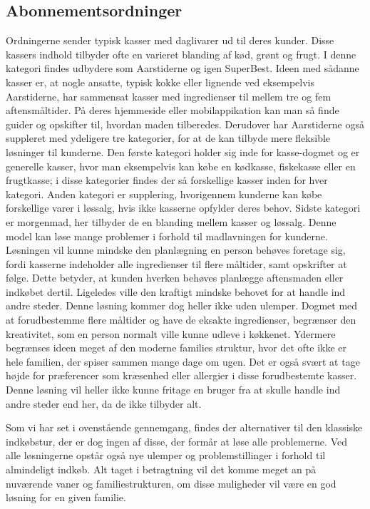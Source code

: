 \subsection{Abonnementsordninger}
Ordningerne sender typisk kasser med daglivarer ud til deres kunder.
Disse kassers indhold tilbyder ofte en varieret blanding af kød, grønt og frugt.
I denne kategori findes udbydere som Aarstiderne og igen SuperBest\citep{SOTA_MP_AAR, SOTA_MP_SB}.
Ideen med sådanne kasser er, at nogle ansatte, typisk kokke eller lignende ved eksempelvis Aarstiderne, har sammensat kasser med ingredienser til mellem tre og fem aftensmåltider.
På deres hjemmeside eller mobilappikation kan man så finde guider og opskifter til, hvordan maden tilberedes.
Derudover har Aarstiderne også suppleret med ydeligere tre kategorier, for at de kan tilbyde mere fleksible løsninger til kunderne.
Den første kategori holder sig inde for kasse-dogmet og er generelle kasser, hvor man eksempelvis kan købe en kødkasse, fiskekasse eller en frugtkasse; i disse kategorier findes der så forskellige kasser inden for hver kategori.
Anden kategori er supplering, hvorigennem kunderne kan købe forskellige varer i løssalg, hvis ikke kasserne opfylder deres behov.
Sidste kategori er morgenmad, her tilbyder de en blanding mellem kasser og løssalg.
Denne model kan løse mange problemer i forhold til madlavningen for kunderne.
Løsningen vil kunne mindske den planlægning en person behøves foretage sig, fordi kasserne indeholder alle ingredienser til flere måltider, samt opskrifter at følge.
Dette betyder, at kunden hverken behøves planlægge aftensmaden eller indkøbet dertil.
Ligeledes ville den kraftigt mindske behovet for at handle ind andre steder.
Denne løsning kommer dog heller ikke uden ulemper.
Dogmet med at forudbestemme flere måltider og have de eksakte ingredienser, begrænser den kreativitet, som en person normalt ville kunne udleve i køkkenet.
Ydermere begrænses ideen meget af den moderne families struktur, hvor det ofte ikke er hele familien, der spiser sammen mange dage om ugen.
Det er også svært at tage højde for præferencer som kræsenhed eller allergier i disse forudbestemte kasser.
Denne løsning vil heller ikke kunne fritage en bruger fra at skulle handle ind andre steder end her, da de ikke tilbyder alt.

Som vi har set i ovenstående gennemgang, findes der alternativer til den klassiske indkøbstur, der er dog ingen af disse, der formår at løse alle problemerne.
Ved alle løsningerne opstår også nye ulemper og problemstillinger i forhold til almindeligt indkøb.
Alt taget i betragtning vil det komme meget an på nuværende vaner og familiestrukturen, om disse muligheder vil være en god løsning for en given familie.
